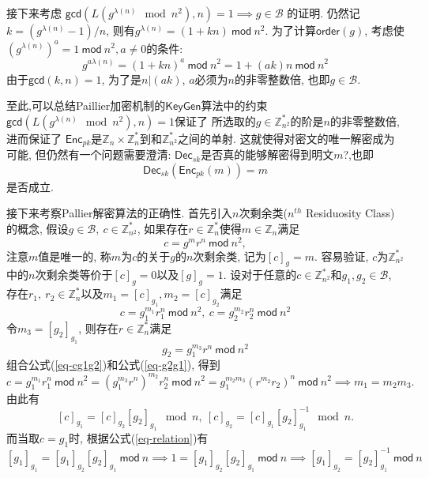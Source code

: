 \documentclass{article}
\newcommand{\Z}{\mathbb{Z}}
\begin{document}
接下来考虑
$\textsf{gcd}\left(L\left(g^{\lambda(n)} \mod n^2\right), n\right) = 1 \implies g\in \mathcal{B}$
的证明. 仍然记$k = \left(g^{\lambda(n)} - 1\right)/n$, 
则有$g^{\lambda(n)} = (1 + kn)~\textsf{mod}~n^2$.
为了计算$\textsf{order}(g)$, 
考虑使$\left(g^{\lambda(n)}\right)^a  = 1~\textsf{mod}~n^2, a\neq 0$的条件:
$$
g^{a\lambda(n)} = (1 + kn)^a~\textsf{mod}~n^2 = 1 + (ak)n ~\textsf{mod}~n^2 
$$
由于$\textsf{gcd}(k, n)= 1$, 为了是$n | (ak)$, $a$必须为$n$的非零整数倍, 也即$g \in \mathcal{B}$.

至此,可以总结Paillier加密机制的$\textsf{KeyGen}$算法中的约束
$\textsf{gcd}\left(L\left(g^{\lambda(n)} \mod n^2\right), n\right) = 1$保证了
所选取的$g\in\Z_{n^2}^*$的阶是$n$的非零整数倍, 进而保证了
$\textsf{Enc}_{pk}$是$\Z_n\times\Z_n^*$到和$\Z_{n^2}^*$之间的单射.
这就使得对密文的唯一解密成为可能, 但仍然有一个问题需要澄清:
$\textsf{Dec}_{sk}$是否真的能够解密得到明文$m$?,也即
$$
\textsf{Dec}_{sk}\left(\textsf{Enc}_{pk}(m)\right) = m
$$
是否成立. 

接下来考察Pallier解密算法的正确性. 
首先引入$n$次剩余类($n^{th}$ Residuosity Class)的概念,
假设$g\in\mathcal{B},\ c\in\Z_{n^2}^*$, 如果存在$r\in\Z_{n}^*$使得$m \in \Z_n$满足
$$
c = g^mr^n~\textsf{mod}~n^2,
$$
注意$m$值是唯一的, 称$m$为$c$的关于$g$的$n$次剩余类, 记为$[c]_g = m$.
容易验证, $c$为$\Z_{n^2}^*$中的$n$次剩余类等价于$[c]_g = 0$以及$[g]_g  = 1$.
设对于任意的$c\in\Z_{n^2}^*$和$g_1, g_2 \in \mathcal{B}$, 
存在$r_1,\ r_2 \in \Z_n^*$以及$m_1 = [c]_{g_1}, m_2 = [c]_{g_2}$满足
\begin{equation}\label{eq-cg1g2}
c = g_1^{m_1}r_1^n ~\textsf{mod}~ n^2, \ 
c = g_2^{m_2}r_2^n ~\textsf{mod}~ n^2  
\end{equation}
令$m_3 = [g_2]_{g_1}$, 则存在$r\in\Z_n^*$满足
\begin{equation}\label{eq-g2g1}
g_2 = g_1^{m_3}r^{n}~\textsf{mod}~n^2
\end{equation}
组合公式(\ref{eq-cg1g2})和公式(\ref{eq-g2g1}), 得到
$$
c = g_1^{m_1}r_1^n ~\textsf{mod}~ n^2 = 
\left(g_1^{m_3}r^{n}\right)^{m_2}r_2^{n}~\textsf{mod}~n^2 = 
g_1^{m_2m_3}\left(r^{m_2}r_2\right)^n~\textsf{mod}~n^2 
\implies  m_1 = m_2m_3.
$$
由此有
\begin{equation}\label{eq-relation}
[c]_{g_1} = [c]_{g_2}[g_2]_{g_1} \mod n,\ [c]_{g_2} = [c]_{g_1}[g_2]_{g_1}^{-1} \mod n.
\end{equation}
而当取$c = g_1$时, 根据公式(\ref{eq-relation})有
\begin{equation}\label{eq-relation2}
[g_1]_{g_1} = [g_1]_{g_2}[g_2]_{g_1} ~\textsf{mod}~ n 
\implies 1 =  [g_1]_{g_2}[g_2]_{g_1} ~\textsf{mod}~ n 
\implies [g_1]_{g_2} = [g_2]_{g_1}^{-1} ~\textsf{mod}~ n 
\end{equation}
\end{document}

